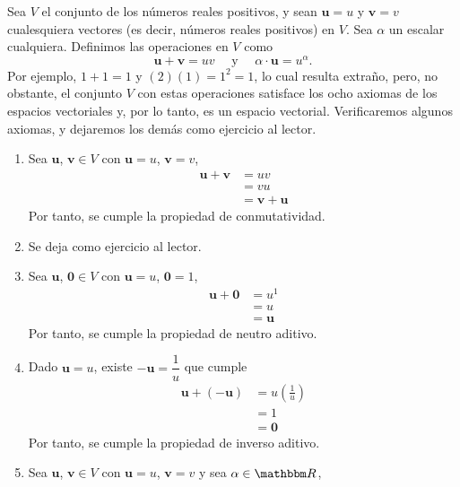 \begin{examplebox}{}{}
    Sea $V$ el conjunto de los números reales positivos, y sean $\mathbf{u} = u$ y $\mathbf{v} = v$ cualesquiera vectores (es decir, números reales positivos) en $V$. Sea $\alpha$ un escalar cualquiera. Definimos las operaciones en $V$ como
    $$\mathbf{u} + \mathbf{v} = uv \quad \text{ y } \quad \alpha \cdot \mathbf{u} = u^{\alpha}.$$
    Por ejemplo, $1 + 1 = 1$ y $(2)(1) = 1^2 = 1$, lo cual resulta extraño, pero, no obstante, el conjunto $V$ con estas operaciones satisface los ocho axiomas de los espacios vectoriales y, por lo tanto, es un espacio vectorial. Verificaremos algunos axiomas, y dejaremos los demás como ejercicio al lector.
    \begin{enumerate}[label=\roman*), topsep=6pt, itemsep=0pt]
        \item Sea $\mathbf{u}$, $\mathbf{v} \in V$ con $\mathbf{u} = u$, $\mathbf{v} = v$,
        \begin{align*}
            \mathbf{u} + \mathbf{v} & = uv \\
            & = vu \\
            & = \mathbf{v} + \mathbf{u}
        \end{align*}
        Por tanto, se cumple la propiedad de conmutatividad.
        \item Se deja como ejercicio al lector.
        \item Sea $\mathbf{u}$, $\mathbf{0} \in V$ con $\mathbf{u} = u$, $\mathbf{0} = 1$,
        \begin{align*}
            \mathbf{u} + \mathbf{0} & = u^1 \\
            & = u \\
            & = \mathbf{u}
        \end{align*}
        Por tanto, se cumple la propiedad de neutro aditivo.
        \item Dado $\mathbf{u} = u$, existe $-\mathbf{u} = \dfrac{1}{u}$ que cumple
        \begin{align*}
            \mathbf{u} + (-\mathbf{u}) & = u \left( \frac{1}{u} \right) \\
            & = 1 \\
            & = \mathbf{0}
        \end{align*}
        Por tanto, se cumple la propiedad de inverso aditivo.
        \item Sea $\mathbf{u}$, $\mathbf{v} \in V$ con $\mathbf{u} = u$, $\mathbf{v} = v$ y sea $\alpha \in \RR$,
        \begin{align*}

\end{align*}
\end{enumerate}
\end{examplebox}
